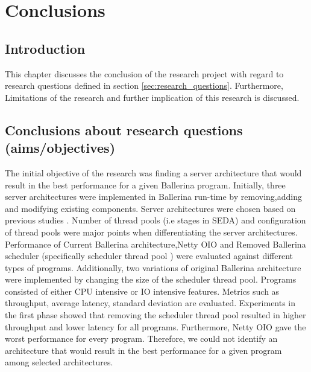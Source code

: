 \chapter{Conclusions}\label{chap:6}

\section{Introduction}

This chapter discusses the conclusion of the research project with regard to research questions defined in section \ref{sec:research_questions}. Furthermore, Limitations of the research and further implication of this research is discussed.

\section{Conclusions about research questions (aims/objectives)}

The initial objective of the research was finding a server architecture that would result in the best performance for a given Ballerina program. Initially, three server architectures were implemented in Ballerina run-time by removing,adding and modifying existing components. Server architectures were chosen based on previous studies \cite{comparing_high_performance_multi_core,comp_ac,flash_server,seda}. Number of thread pools (i.e stages in SEDA) and configuration of thread pools were major points when differentiating the server architectures. Performance of Current Ballerina architecture,Netty OIO and Removed Ballerina scheduler (specifically scheduler thread pool ) were evaluated against different types of programs. Additionally, two variations of original Ballerina architecture were implemented by changing the size of the scheduler thread pool. Programs consisted of either CPU intensive or IO intensive features. Metrics such as throughput, average latency, standard deviation are evaluated. Experiments in the first phase showed that removing the scheduler thread pool resulted in higher throughput and lower latency for all programs. Furthermore, Netty OIO gave  the worst performance for every program. Therefore, we could not identify an architecture that would result in the best performance  for a given program among selected architectures. 


